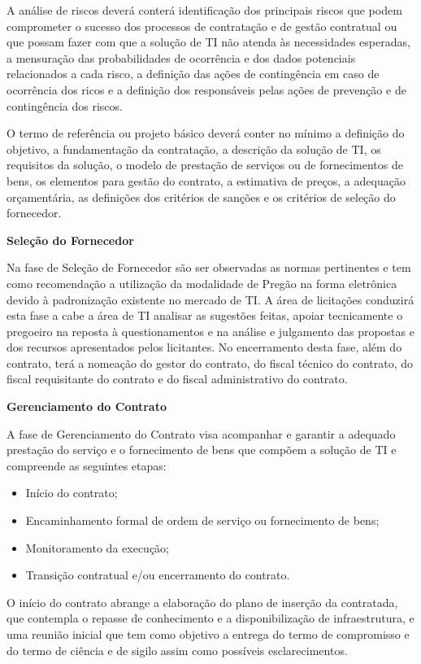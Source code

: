 A análise de riscos deverá conterá identificação dos principais riscos que podem comprometer o sucesso dos processos de contratação e de gestão contratual ou que possam fazer com que a solução de TI não atenda às necessidades esperadas, a mensuração das probabilidades de ocorrência e dos dados potenciais relacionados a cada risco, a definição das ações de contingência em caso de ocorrência dos ricos e a definição dos responsáveis pelas ações de prevenção e de contingência dos riscos.

O termo de referência ou projeto básico deverá conter no mínimo a definição do objetivo, a fundamentação da contratação, a descrição da solução de TI, os requisitos da solução, o modelo de prestação de serviços ou de fornecimentos de bens, os elementos para gestão do contrato, a estimativa de preços, a adequação orçamentária, as definições dos critérios de sanções e os critérios de seleção do fornecedor. 

\textbf {Seleção do Fornecedor}

Na fase de Seleção de Fornecedor são ser observadas as normas pertinentes e tem como recomendação a utilização da modalidade de Pregão na forma eletrônica devido à padronização existente no mercado de TI.  A área de licitações conduzirá esta fase a cabe a área de TI analisar as sugestões feitas, apoiar tecnicamente o pregoeiro na reposta à questionamentos e na análise e julgamento das propostas e dos recursos apresentados pelos licitantes. No encerramento desta fase, além do contrato, terá a nomeação do gestor do contrato, do fiscal técnico do contrato, do fiscal requisitante do contrato e do fiscal administrativo do contrato.

\textbf {Gerenciamento do Contrato}

A fase de Gerenciamento do Contrato visa acompanhar e garantir a adequado prestação do serviço e o fornecimento de bens que compõem a solução de TI e compreende as seguintes etapas: \begin{itemize}
\item Início do contrato; 
\item Encaminhamento formal de ordem de serviço ou fornecimento de bens; 
\item Monitoramento da execução; 
\item Transição contratual e/ou encerramento do contrato. 
\end{itemize}

O início do contrato abrange a elaboração do plano de inserção da contratada, que contempla o repasse de conhecimento e a disponibilização de infraestrutura, e uma reunião inicial que tem como objetivo a entrega do termo de compromisso e do termo de ciência e de sigilo assim como possíveis esclarecimentos. 

